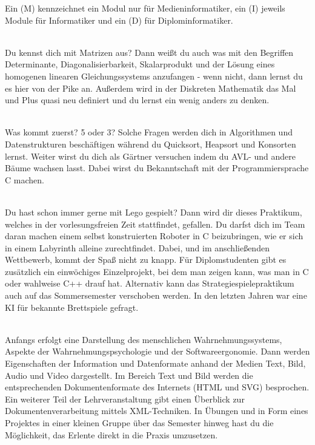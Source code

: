 
Ein (M) kennzeichnet ein Modul nur für Medieninformatiker, ein (I) jeweils Module für Informatiker und ein (D) für Diplominformatiker.


\textbf{}\\
Du kennst dich mit Matrizen aus?
Dann weißt du auch was mit den Begriffen Determinante, Diagonalisierbarkeit, Skalarprodukt und der Lösung eines homogenen linearen Gleichungssystems anzufangen - wenn nicht, dann lernst du es hier von der Pike an.
Außerdem wird in der Diskreten Mathematik das Mal und Plus quasi neu definiert und du lernst ein wenig anders zu denken.

\textbf{} \\
Was kommt zuerst?
5 oder 3?
Solche Fragen werden dich in Algorithmen und Datenstrukturen beschäftigen während du Quicksort, Heapsort und Konsorten lernst.
Weiter wirst du dich als Gärtner versuchen indem du AVL- und andere Bäume wachsen lasst.
Dabei wirst du Bekanntschaft mit der Programmiersprache C machen.

\textbf{} \\
Du hast schon immer gerne mit Lego gespielt?
Dann wird dir dieses Praktikum, welches in der vorlesungsfreien Zeit stattfindet, gefallen.
Du darfst dich im Team daran machen einem selbst konstruierten Roboter in C beizubringen, wie er sich in einem Labyrinth alleine zurechtfindet.
Dabei, und im anschließenden Wettbewerb, kommt der Spaß nicht zu knapp.
Für Diplomstudenten gibt es zusätzlich ein einwöchiges Einzelprojekt, bei dem man zeigen kann, was man in C oder wahlweise C++ drauf hat. Alternativ kann das Strategiespielepraktikum auch auf das Sommersemester verschoben werden.
In den letzten Jahren war eine KI für bekannte Brettspiele gefragt.

\textbf{} \\
Anfangs erfolgt eine Darstellung des menschlichen Wahrnehmungssystems, Aspekte der Wahrnehmungspsychologie und der Softwareergonomie.
Dann werden Eigenschaften der Information und Datenformate anhand der Medien Text, Bild, Audio und Video dargestellt.
Im Bereich Text und Bild werden die entsprechenden Dokumentenformate des Internets (HTML und SVG) besprochen.
Ein weiterer Teil der Lehrveranstaltung gibt einen Überblick zur Dokumentenverarbeitung mittels XML-Techniken.
In Übungen und in Form eines Projektes in einer kleinen Gruppe über das Semester hinweg hast du die Möglichkeit, das Erlente direkt in die Praxis umzusetzen.

